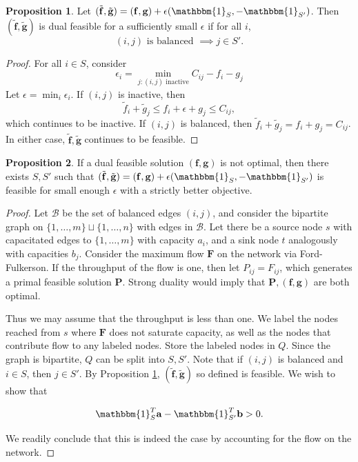 \documentclass[11pt,reqno]{amsart}
\renewcommand{\b}{\mathbf}
\newcommand{\one}{\mathbbm{1}}
\theoremstyle{definition}
\newtheorem{prop}{Proposition}
\theoremstyle{remark}
\begin{document}
\begin{prop}
    Let $(\tilde {\b f}, \tilde {\b g}) = (\b f, \b g) + \epsilon (\one_S,
    -\one_{S'})$. Then $(\tilde {\b f}, \tilde {\b g})$ is dual feasible for a
    sufficiently small $\epsilon$ if for all $i$,
    \[ (i,j) \text{ is balanced } \implies \text{$j \in S'$}. \]
\label{prop:feasible}
\end{prop}

\begin{proof}
    For all $i\in S$, consider
    \[ \epsilon_i = \min_{j: (i,j) \text{ inactive}} C_{ij} - f_i - g_j \]
    Let $\epsilon = \min_i \epsilon_i$. If $(i,j)$ is inactive, then
    \[ \tilde f_i + \tilde g_j \le f_i + \epsilon + g_j\le C_{ij}, \]
    which continues to be inactive. If $(i,j)$ is balanced, then $\tilde f_i +
    \tilde g_j = f_i + g_j = C_{ij}$. In either case, $\tilde {\b f}, \tilde {\b
    g}$ continues to be feasible.
\end{proof}

\begin{prop}
\label{prop:dualascent}
    If a dual feasible solution $(\b f, \b g)$ is not optimal, then there
    exists $S,S'$ such that $(\tilde {\b f}, \tilde {\b g}) = (\b f, \b g) + \epsilon (\one_S,
    -\one_{S'})$ is feasible for small enough $\epsilon$ with a strictly
    better objective.
\end{prop}

\begin{proof}
    Let $\mathcal B$ be the set of balanced edges $(i,j)$, and consider the
    bipartite graph on $\{1,\ldots,m\} \sqcup \{1,\ldots,n\}$ with edges in
    $\mathcal B$. Let there be a source node $s$ with capacitated edges to
    $\{1,\ldots,m\}$ with capacity $a_i$, and a sink node $t$ analogously with
    capacities $b_j$. Consider the maximum flow $\b F$ on the network via
    Ford-Fulkerson. If the throughput of the flow is one, then let $P_ {ij} =
    F_{ij}$, which generates a primal feasible solution $\b P$. Strong duality
    would imply that $\b P, (\b f, \b g)$ are both optimal.
    
    Thus we may assume that the throughput is less than one. We label the nodes
    reached from $s$ where $\b F$ does not saturate capacity, as well as the
    nodes that contribute flow to any labeled nodes. Store the labeled nodes in
    $Q$. Since the graph is bipartite, $Q$ can be split into $S,S'$. Note that
    if $(i,j)$ is balanced and $i\in S$, then $j\in S'$. By Proposition
    \cref{prop:feasible}, $(\tilde {\b f}, \tilde {\b g})$ so defined is
    feasible. We wish to show that
    
    \[ \one_S^T \b a - \one_{S'}^T \b b > 0. \]

    We readily conclude that this is indeed the case by accounting for the
    flow on the network.
\end{proof}
\end{document}

